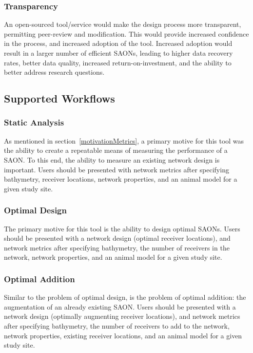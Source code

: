 \subsubsection{Transparency}
\label{motivationTransparency}
An open-sourced tool/service would make the design process more transparent, permitting peer-review and modification.  This would provide increased confidence in the process, and increased adoption of the tool.  Increased adoption would result in a larger number of efficient SAONs, leading to higher data recovery rates, better data quality, increased return-on-investment, and the ability to better address research questions.


\subsection{Supported Workflows}
\label{workflows}
\subsubsection{Static Analysis}
\label{staticAnalysis}
As mentioned in section~\ref{motivationMetrics}, a primary motive for this tool was the ability to create a repeatable means of measuring the performance of a SAON.  To this end, the ability to measure an existing network design is important.  Users should be presented with network metrics after specifying bathymetry, receiver locations, network properties, and an animal model for a given study site.


\subsubsection{Optimal Design}
\label{optimalDesign}
The primary motive for this tool is the ability to design optimal SAONs.  Users should be presented with a network design (optimal receiver locations), and network metrics after specifying bathymetry, the number of receivers in the network, network properties, and an animal model for a given study site.


\subsubsection{Optimal Addition}
\label{optimalAddition}
Similar to the problem of optimal design, is the problem of optimal addition: the augmentation of an already existing SAON.  Users should be presented with a network design (optimally augmenting receiver locations), and network metrics after specifying bathymetry, the number of receivers to add to the network, network properties, existing receiver locations, and an animal model for a given study site.

